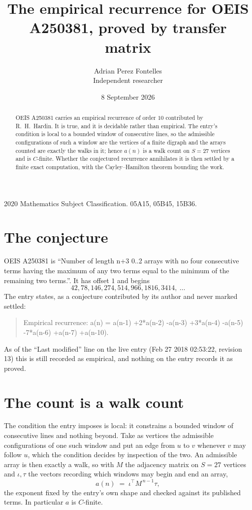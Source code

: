 \documentclass[11pt,a4paper]{article}
\title{The empirical recurrence for OEIS A250381, proved by transfer matrix}
\author{Adrian Perez Fontelles\\ \small Independent researcher}
\date{8 September 2026}
\theoremstyle{plain}
\theoremstyle{definition}
\begin{document}
\maketitle

\begin{abstract}
OEIS A250381 carries an empirical recurrence of order $10$ contributed by R.~H.~Hardin. It is
true, and it is decidable rather than empirical. The entry's condition is local to a bounded window of consecutive lines, so
the admissible configurations of such a window are the vertices of a finite digraph and the
arrays counted are exactly the walks in it; hence $a(n)$ is a walk count on $S=27$ vertices
and is $C$-finite. Whether the conjectured recurrence annihilates it is then settled by a
finite exact computation, with the Cayley--Hamilton theorem bounding the work.
\end{abstract}

\noindent\small 2020 Mathematics Subject Classification. 05A15, 05B45, 15B36.\normalsize

\section{The conjecture}

OEIS A250381 is ``Number of length n+3 0..2 arrays with no four consecutive terms having the maximum of any two terms equal to the minimum of the remaining two terms.''. It has offset $1$ and begins
\[
42, 78, 146, 274, 514, 966, 1816, 3414,\ \dots
\]
The entry states, as a conjecture contributed by its author and never marked settled:
\begin{quote}
Empirical recurrence: a(n) = a(n-1) +2*a(n-2) -a(n-3) +3*a(n-4) -a(n-5) -7*a(n-6) +a(n-7) +a(n-10).
\end{quote}
As of the ``Last modified'' line on the live entry (Feb 27 2018 02:53:22, revision 13) this is still
recorded as empirical, and nothing on the entry records it as proved.

\section{The count is a walk count}

The condition the entry imposes is local: it constrains a bounded window of consecutive lines and nothing beyond. Take as
vertices the admissible configurations of one such window and put an edge from $u$ to $v$
whenever $v$ may follow $u$, which the condition decides by inspection of the two. An
admissible array is then exactly a walk, so with $M$ the adjacency matrix on $S=27$ vertices
and $\iota,\tau$ the vectors recording which windows may begin and end an array,
\[
a(n)\;=\;\iota^{\!\top}M^{\,n-1}\tau ,
\]
the exponent fixed by the entry's own shape and checked against its published terms. In
particular $a$ is $C$-finite.
\end{document}
